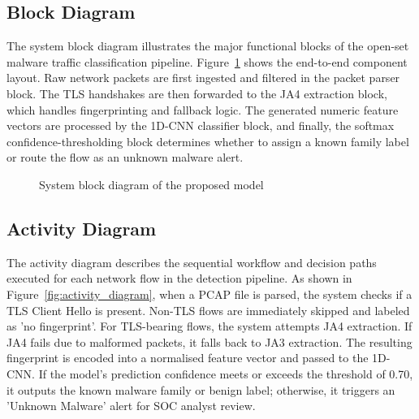 \documentclass[12pt,a4paper]{report}
\begin{document}
\subsection{Block Diagram}

The system block diagram illustrates the major functional blocks of the open-set malware traffic classification pipeline. Figure~\ref{fig:block_diagram} shows the end-to-end component layout. Raw network packets are first ingested and filtered in the packet parser block. The TLS handshakes are then forwarded to the JA4 extraction block, which handles fingerprinting and fallback logic. The generated numeric feature vectors are processed by the 1D-CNN classifier block, and finally, the softmax confidence-thresholding block determines whether to assign a known family label or route the flow as an unknown malware alert.

\begin{figure}[H]
\centering
{}
\caption{System block diagram of the proposed model}
\label{fig:block_diagram}
\end{figure}

\subsection{Activity Diagram}

The activity diagram describes the sequential workflow and decision paths executed for each network flow in the detection pipeline. As shown in Figure~\ref{fig:activity_diagram}, when a PCAP file is parsed, the system checks if a TLS Client Hello is present. Non-TLS flows are immediately skipped and labeled as 'no fingerprint'. For TLS-bearing flows, the system attempts JA4 extraction. If JA4 fails due to malformed packets, it falls back to JA3 extraction. The resulting fingerprint is encoded into a normalised feature vector and passed to the 1D-CNN. If the model's prediction confidence meets or exceeds the threshold of 0.70, it outputs the known malware family or benign label; otherwise, it triggers an 'Unknown Malware' alert for SOC analyst review.
\end{document}
